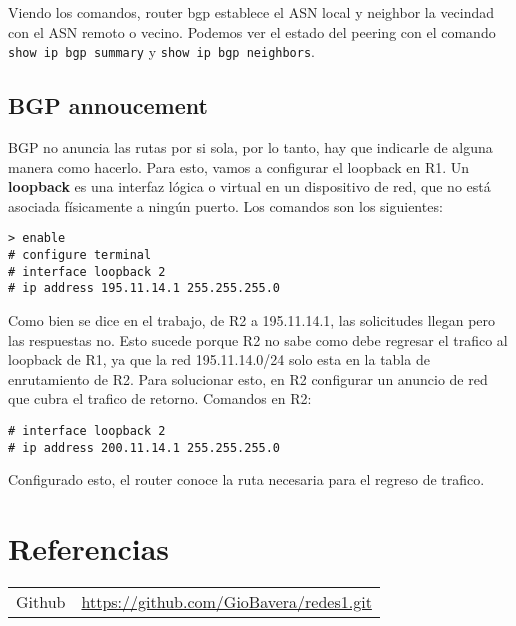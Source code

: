 \documentclass{article}
\begin{document}
Viendo los comandos, router bgp establece el ASN local y neighbor la vecindad con el ASN remoto o vecino. Podemos ver el estado del peering con el comando \texttt{show ip bgp summary} y \texttt{show ip bgp neighbors}.

\subsection{BGP annoucement}

BGP no anuncia las rutas por si sola, por lo tanto, hay que indicarle de alguna manera como hacerlo. Para esto, vamos a configurar el loopback en R1. Un \textbf{loopback} es una interfaz lógica o virtual en un dispositivo de red, que no está asociada físicamente a ningún puerto. Los comandos son los siguientes:

\begin{verbatim}
> enable
# configure terminal
# interface loopback 2
# ip address 195.11.14.1 255.255.255.0
\end{verbatim}

Como bien se dice en el trabajo, de R2 a 195.11.14.1, las solicitudes llegan pero las respuestas no. Esto sucede porque R2 no sabe como debe regresar el trafico al loopback de R1, ya que la red 195.11.14.0/24 solo esta en la tabla de enrutamiento de R2. Para solucionar esto, en R2 configurar un anuncio de red que cubra el trafico de retorno. Comandos en R2: 

\begin{verbatim}
# interface loopback 2
# ip address 200.11.14.1 255.255.255.0
\end{verbatim}

Configurado esto, el router conoce la ruta necesaria para el regreso de trafico.

\section{Referencias}
\begin{tabular}{ll}
Github         & \url{https://github.com/GioBavera/redes1.git} \\
\end{tabular}
\end{document}
